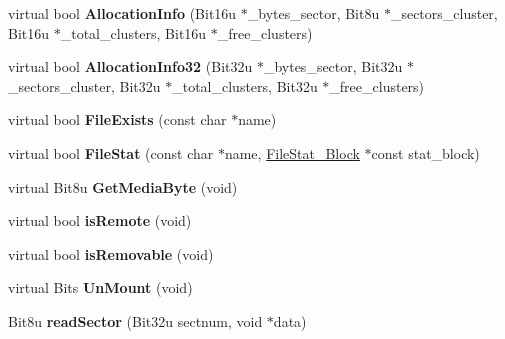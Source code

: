 \begin{DoxyCompactItemize}
\item 
\hypertarget{classfatDrive_a89089651094073f2d5257e187fe10403}{virtual bool {\bfseries Allocation\-Info} (Bit16u $\ast$\-\_\-bytes\-\_\-sector, Bit8u $\ast$\-\_\-sectors\-\_\-cluster, Bit16u $\ast$\-\_\-total\-\_\-clusters, Bit16u $\ast$\-\_\-free\-\_\-clusters)}\label{classfatDrive_a89089651094073f2d5257e187fe10403}

\item 
\hypertarget{classfatDrive_a778b4865bda95e0793488f22c59e119f}{virtual bool {\bfseries Allocation\-Info32} (Bit32u $\ast$\-\_\-bytes\-\_\-sector, Bit32u $\ast$\-\_\-sectors\-\_\-cluster, Bit32u $\ast$\-\_\-total\-\_\-clusters, Bit32u $\ast$\-\_\-free\-\_\-clusters)}\label{classfatDrive_a778b4865bda95e0793488f22c59e119f}

\item 
\hypertarget{classfatDrive_a87594730a6f5c10a579a9e236ada21e9}{virtual bool {\bfseries File\-Exists} (const char $\ast$name)}\label{classfatDrive_a87594730a6f5c10a579a9e236ada21e9}

\item 
\hypertarget{classfatDrive_a10053899bc9ca84a4c99ca5ee5c0716e}{virtual bool {\bfseries File\-Stat} (const char $\ast$name, \hyperlink{structFileStat__Block}{File\-Stat\-\_\-\-Block} $\ast$const stat\-\_\-block)}\label{classfatDrive_a10053899bc9ca84a4c99ca5ee5c0716e}

\item 
\hypertarget{classfatDrive_ad9980844fab3303927f2118d02d55147}{virtual Bit8u {\bfseries Get\-Media\-Byte} (void)}\label{classfatDrive_ad9980844fab3303927f2118d02d55147}

\item 
\hypertarget{classfatDrive_a99edbe351256de3a70e3260fd9bf8df1}{virtual bool {\bfseries is\-Remote} (void)}\label{classfatDrive_a99edbe351256de3a70e3260fd9bf8df1}

\item 
\hypertarget{classfatDrive_a82f0f54ae1d64d62156b03c2f61f347f}{virtual bool {\bfseries is\-Removable} (void)}\label{classfatDrive_a82f0f54ae1d64d62156b03c2f61f347f}

\item 
\hypertarget{classfatDrive_ae4f1277e3b57d312737f2ece5785b2a9}{virtual Bits {\bfseries Un\-Mount} (void)}\label{classfatDrive_ae4f1277e3b57d312737f2ece5785b2a9}

\item 
\hypertarget{classfatDrive_a97bc6dda9d3bec5a85ef2382c0b26654}{Bit8u {\bfseries read\-Sector} (Bit32u sectnum, void $\ast$data)}\label{classfatDrive_a97bc6dda9d3bec5a85ef2382c0b26654}


\end{DoxyCompactItemize}
